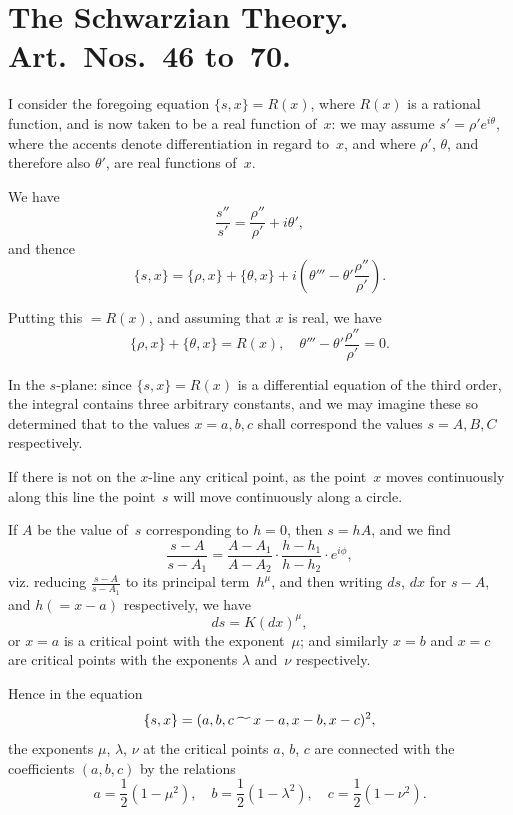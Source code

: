\documentclass[11pt,a4paper]{book}
\begin{document}
\section*{The Schwarzian Theory. Art.~Nos.~46 to~70.}

\begin{art}
I consider the foregoing equation $\{s, x\} = R(x)$, where $R(x)$ is a
rational function, and is now taken to be a real function of~$x$: we may
assume $s' = \rho' e^{i\theta}$, where the accents denote differentiation in regard
to~$x$, and where $\rho'$, $\theta$, and therefore also $\theta'$, are real functions
of~$x$.

We have
\[
\frac{s''}{s'} = \frac{\rho''}{\rho'} + i\theta',
\]
and thence
\[
\{s, x\} = \{\rho, x\} + \{\theta, x\} + i\left(\theta''' - \theta' \frac{\rho''}{\rho'}\right).
\]

Putting this $= R(x)$, and assuming that $x$ is real, we have
\[
\{\rho, x\} + \{\theta, x\} = R(x), \quad \theta''' - \theta' \frac{\rho''}{\rho'} = 0.
\]
\end{art}

\begin{art}
In the $s$-plane: since $\{s, x\} = R(x)$ is a differential equation of the
third order, the integral contains three arbitrary constants, and we may
imagine these so determined that to the values $x = a, b, c$ shall correspond
the values $s = A, B, C$ respectively.

If there is not on the $x$-line any critical point, as the point~$x$ moves
continuously along this line the point~$s$ will move continuously along a
circle.
\end{art}

\begin{art}
If $A$ be the value of~$s$ corresponding to $h = 0$, then $s = hA$, and we find
\[
\frac{s - A}{s - A_1} = \frac{A - A_1}{A - A_2} \cdot \frac{h - h_1}{h - h_2} \cdot e^{i\phi},
\]
viz. reducing $\frac{s-A}{s-A_1}$ to its principal term~$h^\mu$, and then writing
$ds$, $dx$ for $s-A$, and $h (= x-a)$ respectively, we have
\[
ds = K (dx)^\mu,
\]
or $x = a$ is a critical point with the exponent~$\mu$; and similarly $x = b$
and $x = c$ are critical points with the exponents $\lambda$ and~$\nu$ respectively.
\end{art}

\begin{art}
Hence in the equation
\[
\{s, x\} = (a, b, c \,\raisebox{-.5ex}{$\widetilde{\phantom{aa}}$}\, x-a, x-b, x-c)^2,
\]
the exponents $\mu$, $\lambda$, $\nu$ at the critical points $a$, $b$, $c$ are connected
with the coefficients $(a, b, c)$ by the relations
\[
a = \frac{1}{2}(1 - \mu^2), \quad b = \frac{1}{2}(1 - \lambda^2), \quad c = \frac{1}{2}(1 - \nu^2).
\]
\end{art}
\end{document}
